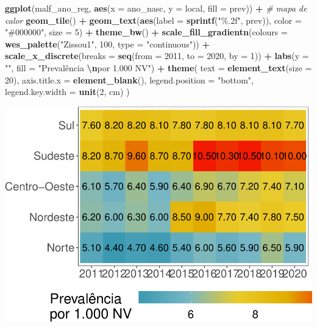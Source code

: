 \documentclass[
]{article}
\newenvironment{Shaded}{\begin{snugshade}}{\end{snugshade}}
\newcommand{\AttributeTok}[1]{\textcolor[rgb]{0.13,0.29,0.53}{#1}}
\newcommand{\CommentTok}[1]{\textcolor[rgb]{0.56,0.35,0.01}{\textit{#1}}}
\newcommand{\DecValTok}[1]{\textcolor[rgb]{0.00,0.00,0.81}{#1}}
\newcommand{\FunctionTok}[1]{\textcolor[rgb]{0.13,0.29,0.53}{\textbf{#1}}}
\newcommand{\NormalTok}[1]{#1}
\newcommand{\SpecialCharTok}[1]{\textcolor[rgb]{0.81,0.36,0.00}{\textbf{#1}}}
\newcommand{\StringTok}[1]{\textcolor[rgb]{0.31,0.60,0.02}{#1}}
\begin{document}
\begin{Shaded}
\begin{Highlighting}[]
\FunctionTok{ggplot}\NormalTok{(malf\_ano\_reg, }\FunctionTok{aes}\NormalTok{(}\AttributeTok{x =}\NormalTok{ ano\_nasc, }\AttributeTok{y =}\NormalTok{ local, }\AttributeTok{fill =}\NormalTok{ prev)) }\SpecialCharTok{+}
  \CommentTok{\# mapa de calor}
  \FunctionTok{geom\_tile}\NormalTok{() }\SpecialCharTok{+}
  \FunctionTok{geom\_text}\NormalTok{(}\FunctionTok{aes}\NormalTok{(}\AttributeTok{label =} \FunctionTok{sprintf}\NormalTok{(}\StringTok{"\%.2f"}\NormalTok{, prev)), }\AttributeTok{color =} \StringTok{"\#000000"}\NormalTok{, }\AttributeTok{size =} \DecValTok{5}\NormalTok{) }\SpecialCharTok{+}
  \FunctionTok{theme\_bw}\NormalTok{() }\SpecialCharTok{+}
  \FunctionTok{scale\_fill\_gradientn}\NormalTok{(}\AttributeTok{colours =} \FunctionTok{wes\_palette}\NormalTok{(}\StringTok{"Zissou1"}\NormalTok{, }\DecValTok{100}\NormalTok{, }\AttributeTok{type =} \StringTok{"continuous"}\NormalTok{)) }\SpecialCharTok{+} 
  \FunctionTok{scale\_x\_discrete}\NormalTok{(}\AttributeTok{breaks =} \FunctionTok{seq}\NormalTok{(}\AttributeTok{from =} \DecValTok{2011}\NormalTok{, }\AttributeTok{to =} \DecValTok{2020}\NormalTok{, }\AttributeTok{by =} \DecValTok{1}\NormalTok{)) }\SpecialCharTok{+}
  \FunctionTok{labs}\NormalTok{(}\AttributeTok{y =} \StringTok{""}\NormalTok{, }\AttributeTok{fill =} \StringTok{"Prevalência }\SpecialCharTok{\textbackslash{}n}\StringTok{por 1.000 NV"}\NormalTok{) }\SpecialCharTok{+}
  \FunctionTok{theme}\NormalTok{(}
    \AttributeTok{text =} \FunctionTok{element\_text}\NormalTok{(}\AttributeTok{size =} \DecValTok{20}\NormalTok{),}
    \AttributeTok{axis.title.x =} \FunctionTok{element\_blank}\NormalTok{(),}
    \AttributeTok{legend.position =} \StringTok{"bottom"}\NormalTok{,}
    \AttributeTok{legend.key.width =} \FunctionTok{unit}\NormalTok{(}\DecValTok{2}\NormalTok{, }\StringTok{\textquotesingle{}cm\textquotesingle{}}\NormalTok{)}
\NormalTok{  )}
\end{Highlighting}
\end{Shaded}

\includegraphics{anom_files/figure-latex/unnamed-chunk-30-1.pdf}
\end{document}
